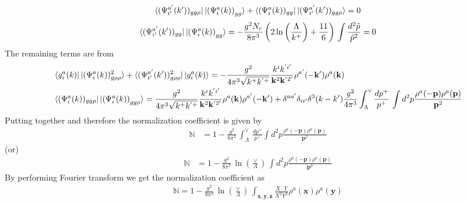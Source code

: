 \documentclass[10pt]{article}
\def\mf#1{\mathbb{#1}}
\def\v#1{\mathbf{#1}}
\numberwithin{equation}{section}
\begin{document}
$$\bra{(\Psi^{a'}_{i'}(k'))_{gg\rho} }\ket{ \left(\Psi^{a}_{i}(k) \right)_{gg} } + \bra{(\Psi^{a}_{i}(k))_{gg} }\ket{(\Psi^{a'}_{i'}(k'))_{gg\rho} } = 0 $$
$$\bra{(\Psi^{a'}_{i'}(k'))_{gg} }\ket{ \left(\Psi^{a}_{i}(k) \right)_{gg} } = -\frac{g^2N_c}{8\pi^3} \left(  2 \ln \bigg(\frac{\Lambda}{k^{+}} \bigg) + \frac{11}{6}  \right) \,\int \frac{d^2\tilde p}{\tilde p^2} = 0 $$
The remaining terms are from
\begin{align}
   & \bra{g^{a}_{i}(k)}\ket{(\Psi^{a}_{i}(k))^{2}_{g\rho\rho} } + \bra{(\Psi^{a'}_{i'}(k'))^{2}_{g\rho\rho} }\ket{g^{a}_{i}(k)}  = -\frac{g^2}{4 \pi^3 \sqrt{k^+ k^{'+}}} \frac{k^{i} k^{'i'}}{\v{k}^2\v{k}^{'2'}} \rho^{a'} (-\v{k}') \rho^a (\v{k}) \notag \\ & \bra{(\Psi^{a}_{i}(k))_{gg\rho} }\ket{ \left(\Psi^{a}_{i}(k) \right)_{gg\rho} } = \frac{g^2}{4 \pi^3 \sqrt{k^+ k^{'+}}} \frac{k^{i} k^{'i'}}{\v{k}^2\v{k}^{'2'}}\rho^a (\v{k}) \rho^{a'} (-\v{k}')+ 
 \delta^{a a'} \delta_{i i'}  \delta^3(k-k')  
  \frac{g^2}{4 \pi^3 } \int_{\Lambda}^{\vee} \frac{dp^{+}}{p^{+}}\,
  \int d^2p \frac{\rho^a(-\v{p}) \rho^a(\v{p})}{\v{p}^2} \nonumber
\end{align}
Putting together and therefore the normalization coefficient is given by 
\begin{align}
\mf{N} & =  
 1 - \frac{g^2}{8 \pi^3 }\, \int_{\Lambda}^{\vee}\,\frac{dp^{+}}{p^{+}}
\int d^2p \frac{\rho^a(-\v{p}) \rho^a(\v{p})}{\v{p}^2}
\end{align}
(or)
\begin{align}
\mf{N} & =  
 1 - \frac{g^2}{8 \pi^3 }\,\ln\left(\frac{\vee}{\Lambda}\right)\,
\int d^2p \frac{\rho^a(-\v{p}) \rho^a(\v{p})}{\v{p}^2}
\end{align}
By performing Fourier transform we get the normalization coefficient as
\begin{align}
\mf{N} =  
 1 - \frac{g^2}{8 \pi^3 }\,\ln\left(\frac{\vee}{\Lambda}\right)\, 
  \int_{\v{x}, \v{y},\v{z}} \frac{X\cdot Y}{X^2 Y^2}   \rho^a(\v{x}) \rho^a(\v{y})
\end{align}
\newpage
\end{document}
